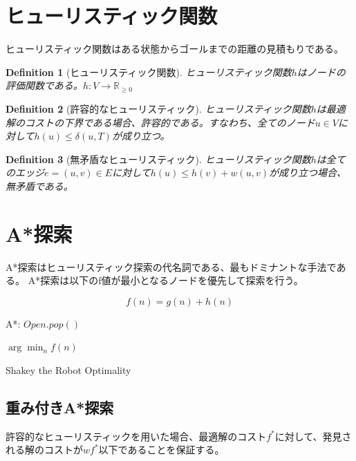 \documentclass{report}
\newtheorem{definition}{Definition}
\begin{document}
\section{ヒューリスティック関数}
\label{sec:heuristic-function}

ヒューリスティック関数はある状態からゴールまでの距離の見積もりである。

\begin{definition}[ヒューリスティック関数]
ヒューリスティック関数$h$はノードの評価関数である。$h: V \rightarrow \mathbb{R}_{\geq 0}$
\end{definition}

\begin{definition}[許容的なヒューリスティック]
ヒューリスティック関数$h$は最適解のコストの下界である場合、許容的である。すなわち、全てのノード$u \in V$に対して$h(u) \leq \delta(u, T)$が成り立つ。
\end{definition}

\begin{definition}[無矛盾なヒューリスティック]
ヒューリスティック関数$h$は全てのエッジ$e = (u, v) \in E$に対して$h(u) \leq h(v) + w(u,v)$が成り立つ場合、無矛盾である。
\end{definition}


\section{A*探索}
\label{sec:astar-search}

A*探索はヒューリスティック探索の代名詞である、最もドミナントな手法である。
A*探索は以下のf値が最小となるノードを優先して探索を行う。

\begin{equation}
	f(n) = g(n) + h(n)
\end{equation}

\begin{algorithm}
\caption{A*: $Open.pop()$}
\label{alg:astar-open}
	\Return $\arg \min_n f(n)$
\end{algorithm}

Shakey the Robot
Optimality





\subsection{重み付きA*探索}
\label{sec:weighted-astar-search}

許容的なヒューリスティックを用いた場合、最適解のコスト$f^*$に対して、発見される解のコストが$w f^*$以下であることを保証する。
\end{document}
